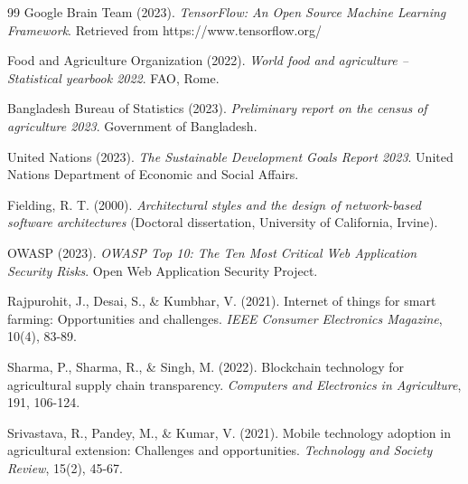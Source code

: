 \documentclass[12pt,a4paper]{report}
\begin{document}
\begin{thebibliography}{99}
Google Brain Team (2023). \textit{TensorFlow: An Open Source Machine Learning Framework}. Retrieved from https://www.tensorflow.org/

Food and Agriculture Organization (2022). \textit{World food and agriculture – Statistical yearbook 2022}. FAO, Rome.

Bangladesh Bureau of Statistics (2023). \textit{Preliminary report on the census of agriculture 2023}. Government of Bangladesh.

United Nations (2023). \textit{The Sustainable Development Goals Report 2023}. United Nations Department of Economic and Social Affairs.

Fielding, R. T. (2000). \textit{Architectural styles and the design of network-based software architectures} (Doctoral dissertation, University of California, Irvine).

OWASP (2023). \textit{OWASP Top 10: The Ten Most Critical Web Application Security Risks}. Open Web Application Security Project.

Rajpurohit, J., Desai, S., \& Kumbhar, V. (2021). Internet of things for smart farming: Opportunities and challenges. \textit{IEEE Consumer Electronics Magazine}, 10(4), 83-89.

Sharma, P., Sharma, R., \& Singh, M. (2022). Blockchain technology for agricultural supply chain transparency. \textit{Computers and Electronics in Agriculture}, 191, 106-124.

Srivastava, R., Pandey, M., \& Kumar, V. (2021). Mobile technology adoption in agricultural extension: Challenges and opportunities. \textit{Technology and Society Review}, 15(2), 45-67.

\end{thebibliography}
\end{document}
